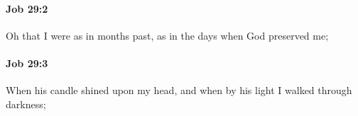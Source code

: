 		\paragraph{Job 29:2} %
			\label{JOB-29-2}

			Oh that I were as in months past, as in the days when God preserved me;


		\paragraph{Job 29:3} %
			\label{JOB-29-3}

			When his candle shined upon my head, and when by his light I walked through darkness;


